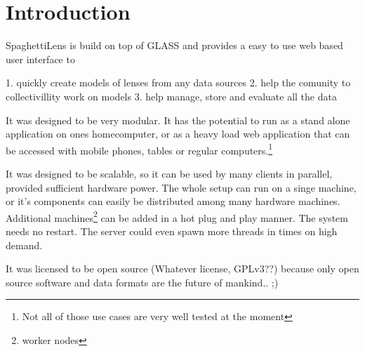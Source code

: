 \section{Introduction}

SpaghettiLens is build on top of GLASS and provides a easy to use web based user interface to

1. quickly create models of lenses from any data sources
2. help the comunity to collectivillity work on models
3. help manage, store and evaluate all the data

It was designed to be very modular. It has the potential to run as a stand alone application on ones homecomputer, or as a heavy load web application that can be accessed with mobile phones, tables or regular computers.\footnote{Not all of those use cases are very well tested at the moment}

It was designed to be scalable, so it can be used by many clients in parallel, provided sufficient hardware power. The whole setup can run on a singe machine, or it's components can easily be distributed among many hardware machines. Additional machines\footnote{worker nodes} can be added in a hot plug and play manner. The system needs no restart. The server could even spawn more threads in times on high demand.

It was licensed to be open source (Whatever license, GPLv3??) because only open source software and data formats are the future of mankind.. ;)




